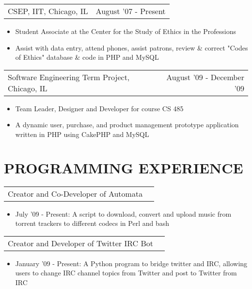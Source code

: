 \documentclass[margin, line]{res}
\begin{document}
\begin{resume}
\begin{tabular}{p{3in} r} %
	CSEP, IIT, Chicago, IL &  August '07 - Present
\end{tabular}
	\begin{itemize}  \itemsep -2pt%
		\item[] Student Associate at the Center for the Study of Ethics in the Professions
		\item[] Assist with data entry, attend phones, assist patrons, review \& correct "Codes of Ethics" database \& code in PHP and MySQL
	\end{itemize}
	
\begin{tabular}{p{3in} r} %
	Software Engineering Term Project, Chicago, IL &  August '09 - December '09
\end{tabular}
	\begin{itemize}  \itemsep -2pt%
		\item[] Team Leader, Designer and Developer for course CS 485
		\item[] A dynamic user, purchase, and product management prototype application written in PHP using CakePHP and MySQL
	\end{itemize}

\section{PROGRAMMING EXPERIENCE}

\begin{tabular}{p{3in} r}
	Creator and Co-Developer of Automata
\end{tabular}	
	\begin{itemize} \itemsep -2pt
		\item[] July '09 - Present: A script to download, convert and upload music from torrent trackers to different codecs in Perl and bash
	\end{itemize}

\begin{tabular}{p{3in} r}
	Creator and Developer of Twitter IRC Bot
\end{tabular}	
	\begin{itemize} \itemsep -2pt
		\item[] January '09 - Present: A Python program to bridge twitter and IRC, allowing users to change IRC channel topics from Twitter and post to Twitter from IRC
	\end{itemize}
	

\end{resume}
\end{document}
